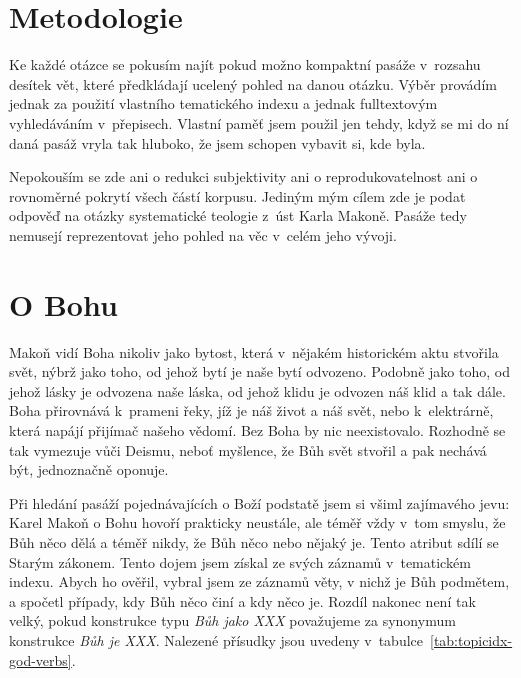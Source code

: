 \section{Metodologie}

Ke každé otázce se pokusím najít pokud možno kompaktní pasáže v~rozsahu desítek
vět, které předkládají ucelený pohled na danou otázku. Výběr provádím jednak za
použití vlastního tematického indexu a jednak fulltextovým vyhledáváním
v~přepisech. Vlastní paměť jsem použil jen tehdy, když se mi do ní daná pasáž
vryla tak hluboko, že jsem schopen vybavit si, kde byla.

Nepokouším se zde ani o redukci subjektivity ani o reprodukovatelnost ani o
rovnoměrné pokrytí všech částí korpusu. Jediným mým cílem zde je podat odpověď
na otázky systematické teologie z~úst Karla Makoně. Pasáže tedy nemusejí
reprezentovat jeho pohled na věc v~celém jeho vývoji.

\section{O Bohu}
\label{teol:o-bohu}

Makoň vidí Boha nikoliv jako bytost, která v~nějakém historickém aktu stvořila
svět, nýbrž jako toho, od jehož bytí je naše bytí odvozeno. Podobně jako toho,
od jehož lásky je odvozena naše láska, od jehož klidu je odvozen náš klid a tak
dále. Boha přirovnává k~prameni řeky, jíž je náš život a náš svět, nebo
k~elektrárně, která napájí přijímač našeho vědomí. Bez Boha by nic neexistovalo.
Rozhodně se tak vymezuje vůči Deismu, neboť myšlence, že Bůh svět stvořil a pak
nechává být, jednoznačně oponuje.

Při hledání pasáží pojednávajících o Boží podstatě jsem si všiml zajímavého
jevu: Karel Makoň o Bohu hovoří prakticky neustále, ale téměř vždy v~tom smyslu,
že Bůh něco dělá a téměř nikdy, že Bůh něco nebo nějaký je. Tento atribut sdílí
se Starým zákonem.\cite{brueggemann2010old} Tento dojem jsem získal ze svých
záznamů v~tematickém indexu. Abych ho ověřil, vybral jsem ze záznamů věty, v nichž je
Bůh podmětem, a spočetl případy, kdy Bůh něco činí a kdy něco je. Rozdíl nakonec
není tak velký, pokud konstrukce typu \textit{Bůh jako XXX} považujeme za
synonymum konstrukce \textit{Bůh je XXX}. Nalezené přísudky jsou uvedeny
v~tabulce~\ref{tab:topicidx-god-verbs}.

